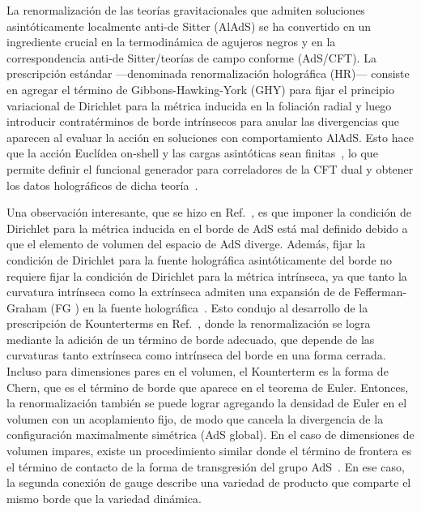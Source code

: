 \documentclass[../Main.tex]{subfiles}
\begin{document}
La renormalización de las teorías gravitacionales que admiten soluciones asintóticamente localmente anti-de Sitter (AlAdS) se ha convertido en un ingrediente crucial en la termodinámica de agujeros negros y en la correspondencia anti-de Sitter/teorías de campo conforme (AdS/CFT). La prescripción estándar ---denominada renormalización holográfica (HR)--- consiste en agregar el término de Gibbons-Hawking-York (GHY) para fijar el principio variacional de Dirichlet para la métrica inducida en la foliación radial y luego introducir contratérminos de borde intrínsecos para anular las divergencias que aparecen al evaluar la acción en soluciones con comportamiento AlAdS. Esto hace que la acción Euclídea on-shell y las cargas asintóticas sean finitas~\cite{Henningson:1998gx,Balasubramanian:1999re,Chamblin:1999tk,Emparan:1999pm,Chamblin:1999hg,Nojiri:1999mh,deHaro:2000vlm,Bianchi:2001kw,Skenderis:2002wp}, lo que permite definir el funcional generador para correladores de la CFT dual y obtener los datos holográficos de dicha teoría~\cite{Gubser:1998bc,Witten:1998qj}. 

Una observación interesante, que se hizo en Ref.~\cite{Papadimitriou:2005ii}, es que imponer la condición de Dirichlet para la métrica inducida en el borde de AdS está mal definido debido a que el elemento de volumen del espacio de AdS diverge. Además, fijar la condición de Dirichlet para la fuente holográfica asintóticamente del borde no requiere fijar la condición de Dirichlet para la métrica intrínseca, ya que tanto la curvatura intrínseca como la extrínseca admiten una expansión de de Fefferman-Graham (FG ) en la fuente holográfica~\cite{AST_1985__S131__95_0,Graham:1999jg}. Esto condujo al desarrollo de la prescripción de Kounterterms en Ref.~\cite{Olea:2006vd}, donde la renormalización se logra mediante la adición de un término de borde adecuado, que depende de las curvaturas tanto extrínseca como intrínseca del borde en una forma cerrada. Incluso para dimensiones pares en el volumen, el Kounterterm es la forma de Chern, que es el término de borde que aparece en el teorema de Euler. Entonces, la renormalización también se puede lograr agregando la densidad de Euler en el volumen con un acoplamiento fijo, de modo que cancela la divergencia de la configuración maximalmente simétrica (AdS global). En el caso de dimensiones de volumen impares, existe un procedimiento similar donde el término de frontera es el término de contacto de la forma de transgresión del grupo AdS~\cite{Mora:2006ka}. En ese caso, la segunda conexión de gauge describe una variedad de producto que comparte el mismo borde que la variedad dinámica.
\end{document}
